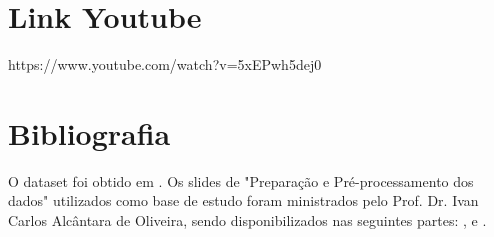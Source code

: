 \documentclass[12pt]{article}
\begin{document}
\section{Link Youtube}
https://www.youtube.com/watch?v=5xEPwh5dej0

\section{Bibliografia}

O dataset foi obtido em \cite{topcu2024top1500}.
Os slides de "Preparação e Pré-processamento dos dados" utilizados como base de 
estudo foram ministrados pelo Prof. Dr. Ivan Carlos Alcântara de Oliveira, sendo 
disponibilizados nas seguintes partes: 
\cite{professor_slides_2024parte1}, \cite{professor_slides_2024parte2} e 
\cite{professor_slides_2024parte3}.



\end{document}
